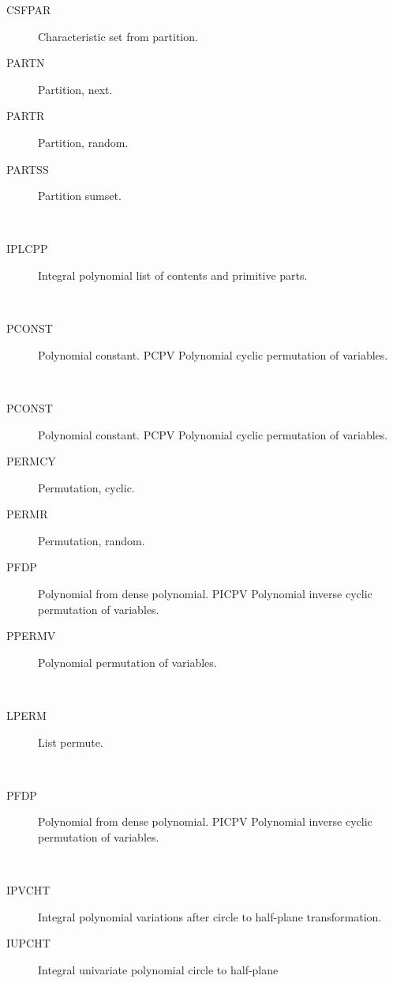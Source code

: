 \begin{description}
  \begin{description}
  \item[CSFPAR]  Characteristic set from partition.
  \item[PARTN]  Partition, next.
  \item[PARTR]  Partition, random.
  \item[PARTSS]  Partition sumset.
  \end{description}
\item[parts] \ \ 
  \begin{description}
  \item[IPLCPP]  Integral polynomial list of contents and primitive parts.
  \end{description}
\item[pcpv] \ \ 
  \begin{description}
  \item[PCONST]  Polynomial constant. PCPV Polynomial cyclic permutation of
    variables.
  \end{description}
\item[permutation] \ \ 
  \begin{description}
  \item[PCONST]  Polynomial constant. PCPV Polynomial cyclic permutation of
    variables.
  \item[PERMCY]  Permutation, cyclic.
  \item[PERMR]  Permutation, random.
  \item[PFDP]  Polynomial from dense polynomial. PICPV Polynomial inverse
    cyclic permutation of variables.
  \item[PPERMV]  Polynomial permutation of variables.
  \end{description}
\item[permute] \ \ 
  \begin{description}
  \item[LPERM]  List permute.
  \end{description}
\item[picpv] \ \ 
  \begin{description}
  \item[PFDP]  Polynomial from dense polynomial. PICPV Polynomial inverse
    cyclic permutation of variables.
  \end{description}
\item[plane] \ \ 
  \begin{description}
  \item[IPVCHT]  Integral polynomial variations after circle to half-plane
    transformation.
  \item[IUPCHT]  Integral univariate polynomial circle to half-plane

\end{description}
\end{description}
